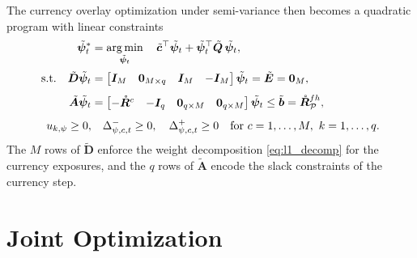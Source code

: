 The currency overlay optimization under semi-variance then becomes a quadratic program with linear constraints
\begin{equation}
\begin{aligned}
    \tilde{\bm{\psi}}_t^* &= \operatorname*{arg\,min}_{\tilde{\bm{\psi}}_t} \quad
     \tilde{\bm{c}}^\top \tilde{\bm{\psi}}_t + \tilde{\bm{\psi}}_t^\top \tilde{\bm{Q}}\, \tilde{\bm{\psi}}_t, \\[2pt]
    \text{s.t.} \quad
    \tilde{\bm{D}} \tilde{\bm{\psi}}_t &=
    \begin{bmatrix} \bm{I}_M & \bm{0}_{M \times q} & \bm{I}_M & -\bm{I}_M \end{bmatrix} \tilde{\bm{\psi}}_t
    = \tilde{\bm{E}} = \bm{0}_M, \\[4pt]
    \tilde{\bm{A}} \tilde{\bm{\psi}}_t &=
    \begin{bmatrix} -\mathring{\bm{R}}^c & -\bm{I}_q & \bm{0}_{q \times M} & \bm{0}_{q \times M} \end{bmatrix}
    \tilde{\bm{\psi}}_t \le \tilde{\bm{b}} = \mathring{\bm{R}}^{fh}_{\mathcal{P}}, \\[4pt]
    u_{k,\psi} \ge 0, & \quad \Delta_{\psi,c,t}^- \ge 0,\quad \Delta_{\psi,c,t}^+ \ge 0
    \quad \text{for } c = 1, \dots, M,\ k = 1, \dots, q.
\end{aligned}
\end{equation}
The $M$ rows of $\tilde{\bm{D}}$ enforce the weight decomposition \eqref{eq:l1_decomp} for the currency exposures,
and the $q$ rows of $\tilde{\bm{A}}$ encode the slack constraints of the currency step.
\section{Joint Optimization} \label{app:mv_joint}

